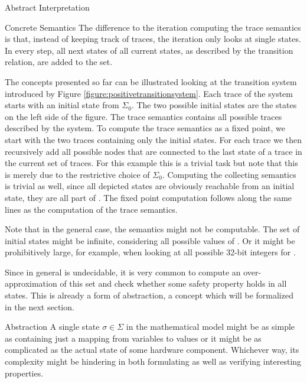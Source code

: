 \begin{chapter}{Abstract Interpretation}
\begin{section}{Concrete Semantics}
		The difference to the iteration computing the trace semantics is that, instead of keeping track of traces, the iteration only looks at single states. In every step, all next states of all current states, as described by the transition relation, are added to the set.

		\begin{example}[Semantics]
			The concepts presented so far can be illustrated looking at the transition system introduced by Figure \ref{figure:positivetransitionsystem}. Each trace of the system starts with an initial state from $\Sigma_0$. The two possible initial states are the states on the left side of the figure. The trace semantics contains all possible traces described by the system. To compute the trace semantics as a fixed point, we start with the two traces containing only the initial states. For each trace we then recursively add all possible nodes that are connected to the last state of a trace in the current set of traces. For this example this is a trivial task but note that this is merely due to the restrictive choice of $\Sigma_0$. Computing the collecting semantics is trivial as well, since all depicted states are obviously reachable from an initial state, they are all part of . The fixed point computation follows along the same lines as the computation of the trace semantics.
		
			Note that in the general case, the semantics might not be computable. The set of initial states might be infinite, considering all possible values of . Or it might be prohibitively large, for example, when looking at all possible 32-bit integers for . 

			\exampleend
		\end{example}


		Since  in general is undecidable, it is very common to compute an over-approximation of this set and check whether some safety property holds in all states. This is already a form of abstraction, a concept which will be formalized in the next section.
	\end{section}


	\begin{section}{Abstraction}
		\label{section:abstraction}
		A single state $\sigma \in \Sigma$ in the mathematical model might be as simple as containing just  a mapping from variables to values or it might be as complicated as the actual state of some hardware component. Whichever way, its complexity might be hindering in both formulating as well as verifying interesting properties. 


\end{section}
\end{chapter}
